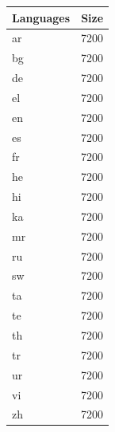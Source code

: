 \begin{figure}[ht]
    \centering
    
    \begin{subtable}{0.32\textwidth}
        \centering
        \begin{tabular}{lr}
            \toprule
            Languages & Size \\
            \midrule
            ar & 7200 \\
            bg & 7200 \\
            de & 7200 \\
            el & 7200 \\
            en & 7200 \\
            es & 7200 \\
            fr & 7200 \\
            he & 7200 \\
            hi & 7200 \\
            ka & 7200 \\
            mr & 7200 \\
            ru & 7200 \\
            sw & 7200 \\
            ta & 7200 \\
            te & 7200 \\
            th & 7200 \\
            tr & 7200 \\
            ur & 7200 \\
            vi & 7200 \\
            zh & 7200 \\
            \bottomrule
        \end{tabular}
        \caption{\citet{chung_improving_2020}}
        \label{tab:chung_clusters_k20}
        


\end{subtable}
\end{figure}
